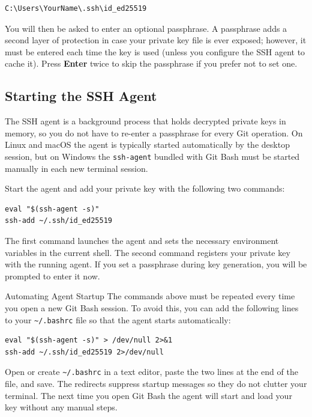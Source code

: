 \begin{lstlisting}[style=windowsStyle, caption={Default key location on Windows}]
C:\Users\YourName\.ssh\id_ed25519
\end{lstlisting}

You will then be asked to enter an optional passphrase. A passphrase adds a second layer of protection in case your private key file is ever exposed; however, it must be entered each time the key is used (unless you configure the SSH agent to cache it). Press \textbf{Enter} twice to skip the passphrase if you prefer not to set one.

\subsection{Starting the SSH Agent}

The SSH agent is a background process that holds decrypted private keys in memory, so you do not have to re-enter a passphrase for every Git operation. On Linux and macOS the agent is typically started automatically by the desktop session, but on Windows the \texttt{ssh-agent} bundled with Git Bash must be started manually in each new terminal session.

Start the agent and add your private key with the following two commands:

\begin{lstlisting}[style=bashstyle, caption={Start the SSH agent and add the private key}]
eval "$(ssh-agent -s)"
ssh-add ~/.ssh/id_ed25519
\end{lstlisting}

The first command launches the agent and sets the necessary environment variables in the current shell. The second command registers your private key with the running agent. If you set a passphrase during key generation, you will be prompted to enter it now.

\begin{tipbox}{Automating Agent Startup}
The commands above must be repeated every time you open a new Git Bash session. To avoid this, you can add the following lines to your \texttt{\textasciitilde/.bashrc} file so that the agent starts automatically:

\begin{lstlisting}[style=bashstyle]
eval "$(ssh-agent -s)" > /dev/null 2>&1
ssh-add ~/.ssh/id_ed25519 2>/dev/null
\end{lstlisting}

Open or create \texttt{\textasciitilde/.bashrc} in a text editor, paste the two lines at the end of the file, and save. The redirects suppress startup messages so they do not clutter your terminal. The next time you open Git Bash the agent will start and load your key without any manual steps.
\end{tipbox}

